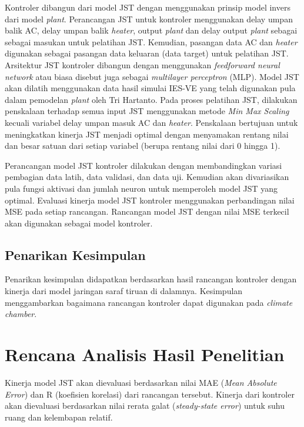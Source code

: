 Kontroler dibangun dari model JST dengan menggunakan prinsip model invers dari model \textit{plant}. Perancangan JST untuk kontroler menggunakan delay umpan balik AC, delay umpan balik \textit{heater}, output \textit{plant} dan delay output \textit{plant} sebagai sebagai masukan untuk pelatihan JST. Kemudian, pasangan data AC dan \textit{heater} digunakan sebagai pasangan data keluaran (data target) untuk pelatihan JST. Arsitektur JST kontroler dibangun dengan menggunakan \textit{feedforward neural network} atau biasa disebut juga sebagai \textit{multilayer perceptron} (MLP). Model JST akan dilatih menggunakan data hasil simulai IES-VE yang telah digunakan pula dalam pemodelan \textit{plant} oleh Tri Hartanto\cite{skripsiTanto}. Pada proses pelatihan JST, dilakukan penskalaan terhadap semua input JST menggunakan metode \textit{Min Max Scaling} kecuali variabel delay umpan masuk AC dan \textit{heater}. Penskalaan bertujuan untuk meningkatkan kinerja JST menjadi optimal dengan menyamakan rentang nilai dan besar satuan dari setiap variabel (berupa rentang nilai dari 0 hingga 1).

Perancangan model JST kontroler dilakukan dengan membandingkan variasi pembagian data latih, data validasi, dan data uji. Kemudian akan divariasikan pula fungsi aktivasi dan jumlah neuron untuk memperoleh model JST yang optimal. Evaluasi kinerja model JST kontroler menggunakan perbandingan nilai MSE pada setiap rancangan. Rancangan model JST dengan nilai MSE terkecil akan digunakan sebagai model kontroler.

\subsection{Penarikan Kesimpulan}
Penarikan kesimpulan didapatkan berdasarkan hasil rancangan kontroler dengan kinerja dari model jaringan saraf tiruan di dalamnya. Kesimpulan menggambarkan bagaimana rancangan kontroler dapat digunakan pada \textit{climate chamber}.

\section{Rencana Analisis Hasil Penelitian}
Kinerja model JST akan dievaluasi berdasarkan nilai MAE (\textit{Mean Absolute Error}) dan R (koefisien korelasi) dari rancangan tersebut. Kinerja dari kontroler akan dievaluasi berdasarkan nilai rerata galat (\textit{steady-state error}) untuk suhu ruang dan kelembapan relatif.